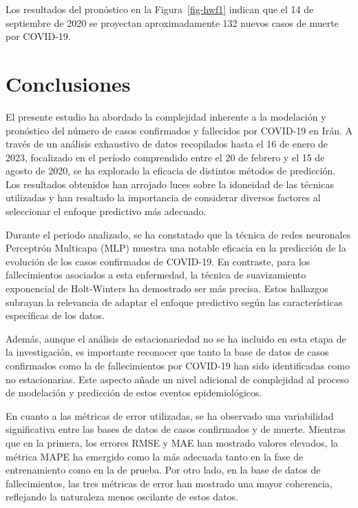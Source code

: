 \documentclass[
  us-letterpaper,
]{scrreprt}
\theoremstyle{plain}
\theoremstyle{definition}
\theoremstyle{plain}
\theoremstyle{definition}
\theoremstyle{remark}
\begin{document}
Los resultados del pronóstico en la Figura~\ref{fig-hwf1} indican que el
14 de septiembre de 2020 se proyectan aproximadamente 132 nuevos casos
de muerte por COVID-19.


\chapter{Conclusiones}\label{conclusiones}

El presente estudio ha abordado la complejidad inherente a la modelación
y pronóstico del número de casos confirmados y fallecidos por COVID-19
en Irán. A través de un análisis exhaustivo de datos recopilados hasta
el 16 de enero de 2023, focalizado en el período comprendido entre el 20
de febrero y el 15 de agosto de 2020, se ha explorado la eficacia de
distintos métodos de predicción. Los resultados obtenidos han arrojado
luces sobre la idoneidad de las técnicas utilizadas y han resaltado la
importancia de considerar diversos factores al seleccionar el enfoque
predictivo más adecuado.

Durante el periodo analizado, se ha constatado que la técnica de redes
neuronales Perceptrón Multicapa (MLP) muestra una notable eficacia en la
predicción de la evolución de los casos confirmados de COVID-19. En
contraste, para los fallecimientos asociados a esta enfermedad, la
técnica de suavizamiento exponencial de Holt-Winters ha demostrado ser
más precisa. Estos hallazgos subrayan la relevancia de adaptar el
enfoque predictivo según las características específicas de los datos.

Además, aunque el análisis de estacionariedad no se ha incluido en esta
etapa de la investigación, es importante reconocer que tanto la base de
datos de casos confirmados como la de fallecimientos por COVID-19 han
sido identificadas como no estacionarias. Este aspecto añade un nivel
adicional de complejidad al proceso de modelación y predicción de estos
eventos epidemiológicos.

En cuanto a las métricas de error utilizadas, se ha observado una
variabilidad significativa entre las bases de datos de casos confirmados
y de muerte. Mientras que en la primera, los errores RMSE y MAE han
mostrado valores elevados, la métrica MAPE ha emergido como la más
adecuada tanto en la fase de entrenamiento como en la de prueba. Por
otro lado, en la base de datos de fallecimientos, las tres métricas de
error han mostrado una mayor coherencia, reflejando la naturaleza menos
oscilante de estos datos.
\end{document}
